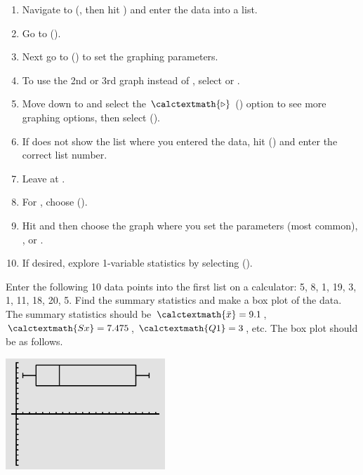 \begin{termBox}{
\begin{enumerate}
\setlength{\itemsep}{0mm}
\item Navigate to  (, then hit ) and enter the data into a list.
\item Go to  ().
\item Next go to  () to set the graphing parameters.
\item To use the 2nd or 3rd graph instead of , select  or .
\item Move down to  and select the $\calctextmath{\triangleright}$ () option to see more graphing options, then select  ().
\item If  does not show the list where you entered the data, hit  () and enter the correct list number.
\item Leave  at .
\item For , choose  ().
\item Hit  and then choose the graph where you set the parameters  (most common), , or .
\item If desired, explore 1-variable statistics by selecting  ().
\end{enumerate}
}
\end{termBox}

\begin{example}{Enter the following 10 data points into the first list on a calculator: {5, 8, 1, 19, 3, 1, 11, 18, 20, 5}. Find the summary statistics and make a box plot of the data.}
The summary statistics should be $\calctextmath{\bar{x}} = 9.1$, $\calctextmath{Sx} = 7.475$, $\calctextmath{Q1} = 3$, etc. The box plot should be as follows.
\begin{center}
\includegraphics[width=0.45\textwidth]{ch_summarizing_data/figures/TI83_box_plot_A/TI83_box_plot_A}
\end{center}
\end{example}

